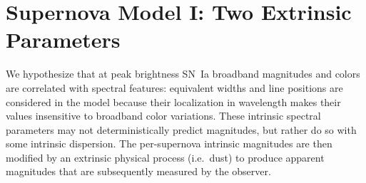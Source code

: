 \documentclass{aastex61}   	%
\begin{document}
\section{Supernova Model I: Two Extrinsic Parameters}
\label{model:sec}

We hypothesize that at peak brightness
SN~Ia broadband magnitudes and colors are correlated with
spectral features: equivalent widths and line positions are considered in the model because their localization in wavelength
makes their values insensitive to 
broadband color variations.
These intrinsic spectral  parameters may not deterministically predict magnitudes, but rather do so with some intrinsic dispersion.
The per-supernova intrinsic magnitudes are then
modified by an extrinsic physical process (i.e.\ dust) to produce apparent magnitudes that are subsequently measured by the observer.
\end{document}
